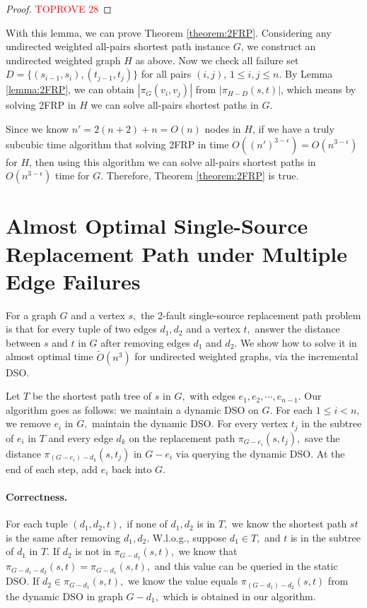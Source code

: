 \documentclass[11pt]{article}
\theoremstyle{plain}
\theoremstyle{definition}
\newcommand{\too}[1]{\tilde{O}({#1})}
\newcommand{\set}[1]{\{ #1 \}}
\newcommand{\og}[3]{\pi_{G-#3}\left(#1,#2\right)}
\newcommand{\hg}[3]{\pi_{H-#3}\left(#1,#2\right)}
\begin{document}
\begin{proof}\textcolor{red}{TOPROVE 28}\end{proof}

With this lemma, we can prove Theorem \ref{theorem:2FRP}. Considering any undirected weighted all-pairs shortest path instance $G$, we construct an undirected weighted graph $H$ as above. Now we check all failure set $D=\set{(s_{i-1},s_{i}),(t_{j-1},t_{j})}$ for all pairs $(i,j)$, $1 \leq i,j \leq n$. By Lemma \ref{lemma:2FRP}, we can obtain $|\pi_G(v_i,v_j)|$ from $|\hg{s}{t}{D}|$, which means by solving 2FRP in $H$ we can solve all-pairs shortest paths in $G$.

Since we know $n' = 2(n+2)+n=O(n)$ nodes in $H$, if we have a truly subcubic time algorithm that solving 2FRP in time $O((n')^{3-\epsilon}) = O(n^{3-\epsilon})$ for $H$, then using this algorithm we can solve all-pairs shortest paths in $O(n^{3-\epsilon})$ time for $G$. Therefore, Theorem \ref{theorem:2FRP} is true. \section{Almost Optimal Single-Source Replacement Path under Multiple Edge Failures}\label{sec:2ssrp}

For a graph $G$ and a vertex $s,$ the 2-fault single-source replacement path problem is that for every tuple of two edges $d_1,d_2$ and a vertex $t,$ answer the distance between $s$ and $t$ in $G$ after removing edges $d_1$ and $d_2.$ We show how to solve it in almost optimal time $\too{n^3}$ for undirected weighted graphs, via the incremental DSO.

Let $T$ be the shortest path tree of $s$ in $G,$ with edges $e_1,e_2,\cdots,e_{n-1}$. Our algorithm goes as follows: we maintain a dynamic DSO on $G.$ For each $1\le i<n,$ we remove $e_i$ in $G,$ maintain the dynamic DSO. For every vertex $t_j$ in the subtree of $e_i$ in $T$ and every edge $d_k$ on the replacement path $\og{s}{t_j}{e_i},$ save the distance $\pi_{(G-e_i)-d_k}(s,t_j)$ in $G-{e_i}$ via querying the dynamic DSO. At the end of each step, add $e_i$ back into $G.$

\paragraph{Correctness.}

For each tuple $(d_1,d_2,t),$ if none of $d_1,d_2$ is in $T,$ we know the shortest path $st$ is the same after removing $d_1,d_2.$ W.l.o.g., suppose $d_1\in T,$ and $t$ is in the subtree of $d_1$ in $T.$ If $d_2$ is not in $\og{s}{t}{d_1},$ we know that $\og{s}{t}{d_1-d_2}=\og{s}{t}{d_1},$ and this value can be queried in the static DSO. If $d_2\in \og{s}{t}{d_1},$ we know the value equals $\pi_{(G-d_1)-d_2}(s,t)$ from the dynamic DSO in graph $G-d_1,$ which is obtained in our algorithm.
\end{document}
